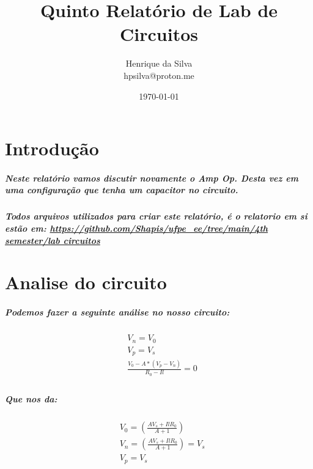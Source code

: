 \documentclass[12pt,twoside, a4paper, twocolumn]{article}
\title{Quinto Relatório de Lab de Circuitos}
\author{Henrique da Silva \\ hpsilva@proton.me}
\date{\today}
\begin{document}
\maketitle
{}
\newpage
\tableofcontents
\newpage



\section{Introdução}

\subparagraph*{Neste relatório vamos discutir novamente o Amp Op. Desta vez em uma configuração que tenha um capacitor no circuito.}

\subparagraph*{Todos arquivos utilizados para criar este relatório, é o relatorio em si estão em:  \url{https://github.com/Shapis/ufpe_ee/tree/main/4th semester/lab circuitos}}


\section{Analise do circuito}

\subparagraph*{Podemos fazer a seguinte análise no nosso circuito:}

\begin{equation}
    \begin{aligned}
         & V_n                                   = V_0 \\
         & V_p                                   = V_s \\
         & \frac{V_0 - A*(V_p - V_n)}{R_0 - Il}  = 0   \\
    \end{aligned}
\end{equation}

\subparagraph*{Que nos da:}


\begin{equation}
    \begin{aligned}
         & V_0 = \left(\frac{A V_s + Il R_0}{A+1}\right)                                         \\
         & V_n =          \left(\frac{A V_s + Il R_0}{A+1}\right)                          = V_s \\
         & V_p  = V_s                                                                            \\
    \end{aligned}
\end{equation}
\end{document}

